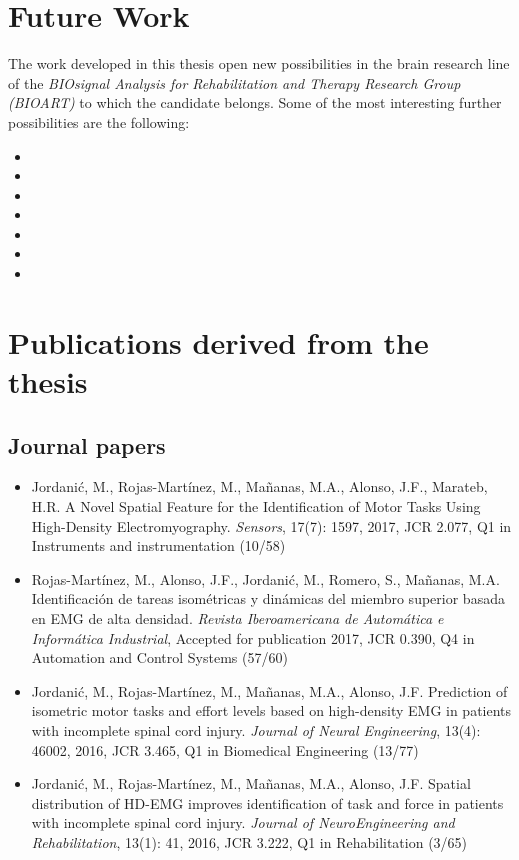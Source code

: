 \section{Future Work}
\label{sec:fw}
The work developed in this thesis open new possibilities in the brain research line of the \emph{BIOsignal Analysis for Rehabilitation and Therapy Research Group (BIOART)} to which the candidate belongs. Some of the most interesting further possibilities are the following: 

\begin{itemize}
\item 

\item 

\item 
\item  

\item 

\item 

\item 
\end{itemize}

\section {Publications derived from the thesis}
\subsection{Journal papers}

\begin{itemize}
\item Jordanić, M., Rojas-Martínez, M., Mañanas, M.A., Alonso, J.F., Marateb, H.R. A Novel Spatial Feature for the Identification of Motor Tasks Using High-Density Electromyography. \textit{Sensors}, 17(7): 1597, 2017, JCR 2.077, Q1 in Instruments and instrumentation (10/58)

\item Rojas-Martínez, M., Alonso, J.F., Jordanić, M., Romero, S., Mañanas, M.A. Identificación de tareas isométricas y dinámicas del miembro superior basada en EMG de alta densidad. \textit{Revista Iberoamericana de Automática e Informática Industrial}, Accepted for publication 2017, JCR 0.390, Q4 in Automation and Control Systems (57/60)

\item Jordanić, M., Rojas-Martínez, M., Mañanas, M.A., Alonso, J.F. Prediction of isometric motor tasks and effort levels based on high-density EMG in patients with incomplete spinal cord injury. \textit{Journal of Neural Engineering}, 13(4): 46002, 2016, JCR 3.465, Q1 in Biomedical Engineering (13/77)

\item Jordanić, M., Rojas-Martínez, M., Mañanas, M.A., Alonso, J.F. Spatial distribution of HD-EMG improves identification of task and force in patients with incomplete spinal cord injury. \textit{Journal of NeuroEngineering and Rehabilitation}, 13(1): 41, 2016, JCR 3.222, Q1 in Rehabilitation (3/65)
\end{itemize}




